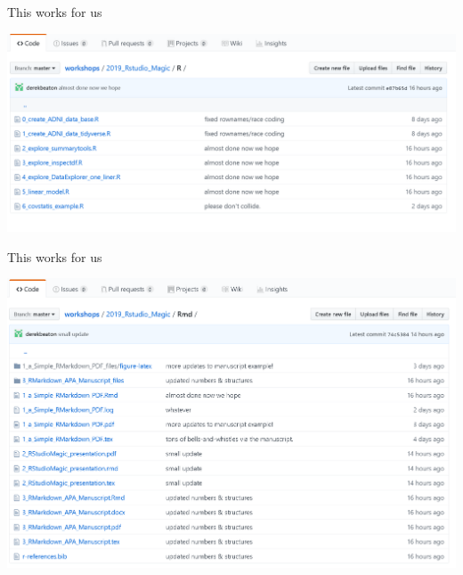 \documentclass[ignorenonframetext,]{beamer}
\begin{document}
\begin{frame}{This works for us}
\protect\hypertarget{this-works-for-us-1}{}

\includegraphics{../external/images/Rfolder.PNG}

\end{frame}

\begin{frame}{This works for us}
\protect\hypertarget{this-works-for-us-2}{}

\includegraphics{../external/images/RMDfolder.PNG}

\end{frame}
\end{document}
